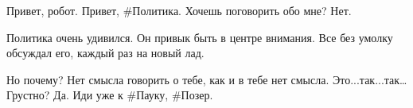 \begin{dialog}
\X Привет, робот.
\R Привет, \#Политика.
\X Хочешь поговорить обо мне?
\R Нет.
\end{dialog}

\begin{monolog}
Политика очень удивился. Он привык быть в центре внимания. Все без умолку обсуждал его, каждый раз на новый лад.
\end{monolog}

\begin{dialog}
\X Но почему?
\R Нет смысла говорить о тебе, как и в тебе нет смысла.
\X Это...так...так…
\R Грустно?
\X Да.
\R Иди уже к \#Пауку, \#Позер.
\end{dialog}